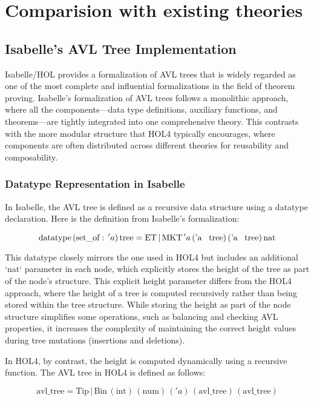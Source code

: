 \chapter{Comparision with existing theories}\label{chap:LaTeXAdvice}

\section{Isabelle’s AVL Tree Implementation}

Isabelle/HOL provides a formalization of AVL trees that is widely regarded as one of the most complete and influential formalizations in the field of theorem proving. Isabelle's formalization of AVL trees follows a monolithic approach, where all the components—data type definitions, auxiliary functions, and theorems—are tightly integrated into one comprehensive theory. This contrasts with the more modular structure that HOL4 typically encourages, where components are often distributed across different theories for reusability and composability.

\subsection{Datatype Representation in Isabelle}
In Isabelle, the AVL tree is defined as a recursive data structure using a datatype declaration. Here is the definition from Isabelle’s formalization:

\[
\text{datatype} \, (\text{set\_of}: \, 'a) \, \text{tree} = 
\text{ET} \, | \, \text{MKT} \, 'a \, (\text{'a \, tree}) \, (\text{'a \, tree}) \, \text{nat}
\]

This datatype closely mirrors the one used in HOL4 but includes an additional `nat` parameter in each node, which explicitly stores the height of the tree as part of the node’s structure. This explicit height parameter differs from the HOL4 approach, where the height of a tree is computed recursively rather than being stored within the tree structure. While storing the height as part of the node structure simplifies some operations, such as balancing and checking AVL properties, it increases the complexity of maintaining the correct height values during tree mutations (insertions and deletions).

In HOL4, by contrast, the height is computed dynamically using a recursive function. The AVL tree in HOL4 is defined as follows:

\[
\text{avl\_tree} = \text{Tip} \, | \, \text{Bin} \, (\text{int}) \, (\text{num}) \, ('a) \, (\text{avl\_tree}) \, (\text{avl\_tree})
\]

